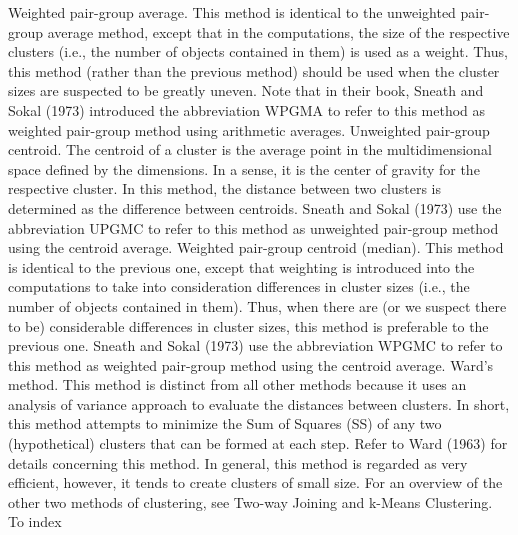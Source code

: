Weighted pair-group average. This method is identical to the unweighted pair-group average method, except that in the computations, the size of the respective clusters (i.e., the number of objects contained in them) is used as a weight. Thus, this method (rather than the previous method) should be used when the cluster sizes are suspected to be greatly uneven. Note that in their book, Sneath and Sokal (1973) introduced the abbreviation WPGMA to refer to this method as weighted pair-group method using arithmetic averages.
Unweighted pair-group centroid. The centroid of a cluster is the average point in the multidimensional space defined by the dimensions. In a sense, it is the center of gravity for the respective cluster. In this method, the distance between two clusters is determined as the difference between centroids. Sneath and Sokal (1973) use the abbreviation UPGMC to refer to this method as unweighted pair-group method using the centroid average.
Weighted pair-group centroid (median). This method is identical to the previous one, except that weighting is introduced into the computations to take into consideration differences in cluster sizes (i.e., the number of objects contained in them). Thus, when there are (or we suspect there to be) considerable differences in cluster sizes, this method is preferable to the previous one. Sneath and Sokal (1973) use the abbreviation WPGMC to refer to this method as weighted pair-group method using the centroid average.
Ward's method. This method is distinct from all other methods because it uses an analysis of variance approach to evaluate the distances between clusters. In short, this method attempts to minimize the Sum of Squares (SS) of any two (hypothetical) clusters that can be formed at each step. Refer to Ward (1963) for details concerning this method. In general, this method is regarded as very efficient, however, it tends to create clusters of small size.
For an overview of the other two methods of clustering, see Two-way Joining and k-Means Clustering.
To index


